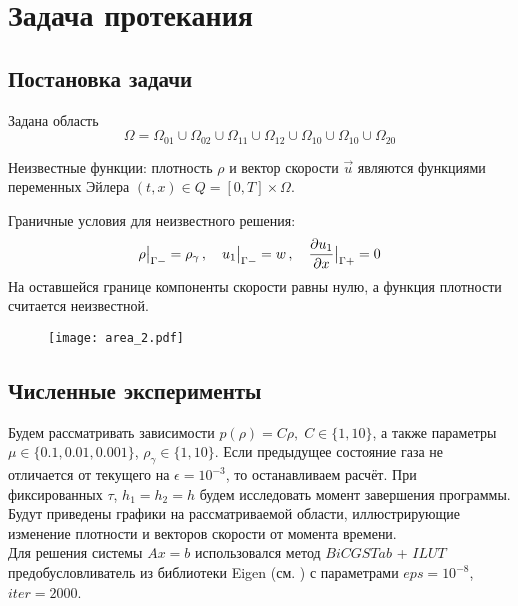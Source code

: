 \section{Задача протекания}

\subsection{Постановка задачи}
Задана область $$\Omega = \Omega_{01} \cup \Omega_{02} \cup \Omega_{11} \cup \Omega_{12} \cup \Omega_{10} \cup \Omega_{10} \cup \Omega_{20} $$

Неизвестные функции: плотность $\rho$ и вектор скорости $\vec{u}$ являются функциями переменных Эйлера $(t, x) \in Q = [0, T] \times \Omega$.

Граничные условия для неизвестного решения: 
$$
	\rho \big|_{\Gamma-} = \rho_\gamma   \,, \quad
	u_1 \big|_{\Gamma-} = w              \,, \quad
	\dfrac{\partial u_1}{\partial x} \big|_{\Gamma+} = 0
$$
На оставшейся границе компоненты скорости равны нулю, а функция плотности считается неизвестной.

\begin{figure}[h!] \centering
	\texttt{[image: area\_2.pdf]}
\end{figure}


\subsection{Численные эксперименты}
Будем рассматривать зависимости $ p(\rho) = C \rho, \; C \in \{1, 10\} $, а также параметры  $\mu \in \{0.1, 0.01, 0.001\}$, $\rho_\gamma \in \{1, 10\}$. Если предыдущее состояние газа не отличается от текущего на $\epsilon = 10^{-3}$, то останавливаем расчёт. При фиксированных $\tau$, $h_1 = h_2 = h$ будем исследовать момент завершения программы.  \\


Будут приведены графики на рассматриваемой области, иллюстрирующие изменение плотности и векторов скорости от момента времени.\\

Для решения системы $Ax = b$ использовался метод $BiCGSTab$ + $ILUT$ предобусловливатель из библиотеки Eigen (см. \cite{Eigen}) с параметрами $eps = 10^{-8}$, $iter = 2000$.

\newpage

